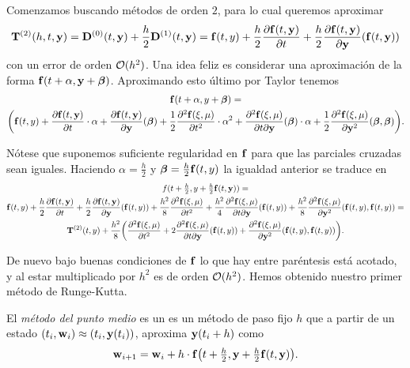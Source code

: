Comenzamos buscando métodos de orden $2$,
para lo cual queremos aproximar
\begin{equation*}
    \vb{T}^{(2)}(h, t, \vb{y}{}) =
    \vb{D}^{(0)}(t, \vb{y}{}) + \frac{h}{2} \vb{D}^{(1)}(t, \vb{y}{}) =
    \vb{f}{}(t,y) + \frac{h}{2}\pdv{\vb{f}{}(t, \vb{y}{})}{t} +
        \frac{h}{2}\pdv{\vb{f}{}(t, \vb{y}{})}{\vb{y}{}}\qty(\vb{f}{}(t, \vb{y}{}))
\end{equation*}
con un error de orden $\vb{\mathcal{O}}{}(h^2)$.
Una idea feliz es considerar una aproximación de la forma
$\vb{f}{}(t + \alpha, \vb{y}{} + \vb*{\beta})$.
Aproximando esto último por Taylor tenemos
\begin{multline*}
    \vb{f}{}(t + \alpha, y + \vb*{\beta}) = \\
    \qty(
        \vb{f}{}(t,y) +
        \pdv{\vb{f}{}(t, \vb{y}{})}{t} \cdot \alpha +
        \pdv{\vb{f}{}(t, \vb{y}{})}{\vb{y}{}} \qty(\vb*{\beta}) +
        \frac{1}{2}\pdv[2]{\vb{f}{}(\xi, \mu)}{t} \cdot \alpha^2 +
        \pdv{\vb{f}{}(\xi, \mu)}{t}{\vb{y}{}} \qty(\vb*{\beta}) \cdot \alpha +
        \frac{1}{2}\pdv[2]{\vb{f}{}(\xi, \mu)}{\vb{y}{}} \qty(\vb*{\beta}, \vb*{\beta})
    ).
\end{multline*}

Nótese que suponemos suficiente regularidad en $\vb{f}{}$
para que las parciales cruzadas sean iguales.
Haciendo $\alpha = \frac{h}{2}$ y $\vb*{\beta} = \frac{h}{2} \vb{f}{}(t,y)$
la igualdad anterior se traduce en
\begin{multline*}
    f(t + \tfrac{h}{2}, y + \tfrac{h}{2}\vb{f}{}(t, \vb{y}{})) = \\
    \vb{f}{}(t,y) +
        \frac{h}{2}\pdv{\vb{f}{}(t, \vb{y}{})}{t} +
        \frac{h}{2}\pdv{\vb{f}{}(t, \vb{y}{})}{\vb{y}{}} \qty(\vb{f}{}(t, y)) +
        \frac{h^2}{8}\pdv[2]{\vb{f}{}(\xi, \mu)}{t} +
        \frac{h^2}{4}\pdv{\vb{f}{}(\xi, \mu)}{t}{\vb{y}{}} \qty(\vb{f}{}(t, y)) +
        \frac{h^2}{8}\pdv[2]{\vb{f}{}(\xi, \mu)}{\vb{y}{}} \qty(\vb{f}{}(t, y), \vb{f}{}(t, y)) = \\
    \vb{T}^{(2)}(t, y) + \frac{h^2}{8}\qty(
        \pdv[2]{\vb{f}{}(\xi, \mu)}{t} +
        2\pdv{\vb{f}{}(\xi, \mu)}{t}{\vb{y}{}} \qty(\vb{f}{}(t, y)) +
        \pdv[2]{\vb{f}{}(\xi, \mu)}{\vb{y}{}} \qty(\vb{f}{}(t, y), \vb{f}{}(t, y))
    ).
\end{multline*}

De nuevo bajo buenas condiciones de $\vb{f}{}$
lo que hay entre paréntesis está acotado,
y al estar multiplicado por $h^2$ es de orden $\vb{\mathcal{O}}{}(h^2)$.
Hemos obtenido nuestro primer método de Runge-Kutta.

\begin{method}\label{met:mean-point}
    El \emph{método del punto medio} es un es un método de paso fijo $h$ que
    a partir de un estado $(t_i, \vb{w}{}_i) \approx (t_i, \vb{y}{}(t_i))$,
    aproxima $\vb{y}{}(t_i + h)$ como
    \begin{equation*}
        \vb{w}{}_{i+1} = \vb{w}{}_i + h\cdot \vb{f}{}\qty(
            t + \tfrac{h}{2}, \vb{y}{} + \tfrac{h}{2}\vb{f}{}(t, \vb{y}{})
        ).
    \end{equation*}
\end{method}

